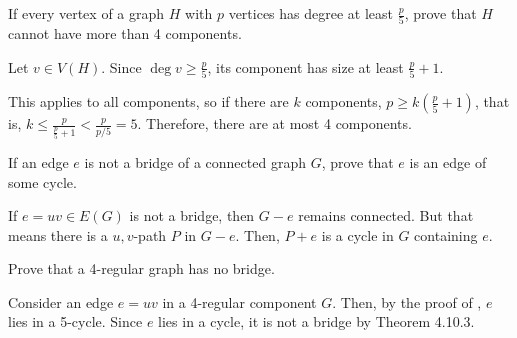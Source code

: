 \documentclass[class=math239,notes,tikz]{agony}
\begin{document}
\begin{xca}
  If every vertex of a graph $H$ with $p$ vertices has degree at least $\frac{p}{5}$,
  prove that $H$ cannot have more than 4 components.
\end{xca}
\begin{prf}
  Let $v \in V(H)$. Since $\deg v \geq \frac{p}{5}$,
  its component has size at least $\frac{p}{5} + 1$.

  This applies to all components, so if there are $k$ components,
  $p \geq k(\frac{p}{5}+1)$, that is, $k \leq \frac{p}{\frac{p}{5}+1} < \frac{p}{p/5} = 5$.
  Therefore, there are at most 4 components.
\end{prf}

\begin{xca}
  If an edge $e$ is not a bridge of a connected graph $G$,
  prove that $e$ is an edge of some cycle.
\end{xca}
\begin{prf}
  If $e = uv \in E(G)$ is not a bridge, then $G - e$ remains connected.
  But that means there is a $u,v$-path $P$ in $G - e$.
  Then, $P + e$ is a cycle in $G$ containing $e$.
\end{prf}

\begin{xca}
  Prove that a 4-regular graph has no bridge.
\end{xca}
\begin{prf}
  Consider an edge $e = uv$ in a 4-regular component $G$.
  Then, by the proof of , $e$ lies in a 5-cycle.
  Since $e$ lies in a cycle, it is not a bridge by Theorem 4.10.3.
\end{prf}
\end{document}
